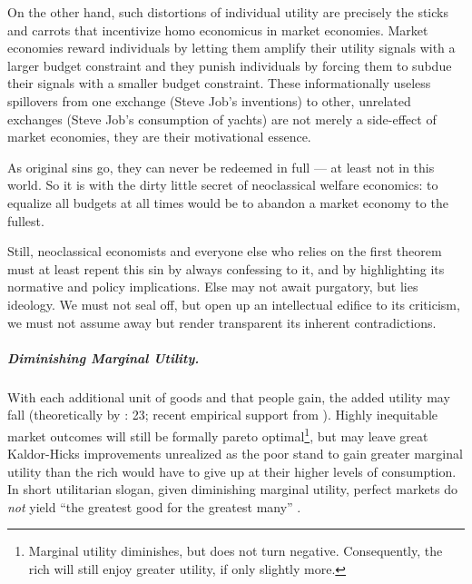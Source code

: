 On the other hand, such distortions of individual utility are precisely the sticks and carrots that incentivize homo economicus in market economies. Market economies reward individuals by letting them amplify their utility signals with a larger budget constraint and they punish individuals by forcing them to subdue their signals with a smaller budget constraint. These informationally useless spillovers from one exchange (Steve Job's inventions) to other, unrelated exchanges (Steve Job's consumption of yachts) are not merely a side-effect of market economies, they are their motivational essence.

As original sins go, they can never be redeemed in full --- at least not in this world. So it is with the dirty little secret of neoclassical welfare economics: to equalize all budgets at all times would be to abandon a market economy to the fullest. %

Still, neoclassical economists and everyone else who relies on the first theorem must at least repent this sin by always confessing to it, and by highlighting its normative and policy implications. Else may not await purgatory, but lies ideology. We must not seal off, but open up an intellectual edifice to its criticism, we must not assume away but render transparent its inherent contradictions.

\subparagraph{Diminishing Marginal Utility.} \label{sec:diminishing-marginal-utility} With each additional unit of goods and that people gain, the added utility may fall (theoretically by \citealt{Lerner1944}: 23; recent empirical support from \citealt{Ng-1997-aa,Veenhoven-2000-aa,Nickell2008}). Highly inequitable market outcomes will still be formally pareto optimal\footnote{
	Marginal utility diminishes, but does not turn negative. Consequently, the rich will still enjoy greater utility, if only slightly more.}, 
but may leave great Kaldor-Hicks improvements unrealized as the poor stand to gain greater marginal utility than the rich would have to give up at their higher levels of consumption. In short utilitarian slogan, given diminishing marginal utility, perfect markets do \emph{not} yield ``the greatest good for the greatest many'' \citep{Mill1863}.

